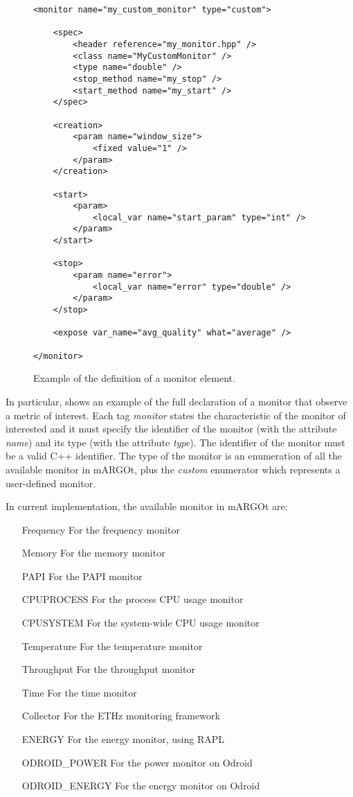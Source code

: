 \begin{figure}
\lstset{language=XML}
\begin{lstlisting}
<monitor name="my_custom_monitor" type="custom">

	<spec>
		<header reference="my_monitor.hpp" />
		<class name="MyCustomMonitor" />
		<type name="double" />
		<stop_method name="my_stop" />
		<start_method name="my_start" />
	</spec>
	
	<creation>
		<param name="window_size">
			<fixed value="1" />
		</param>
	</creation>
	
	<start>
		<param>
			<local_var name="start_param" type="int" />
		</param>
	</start>

	<stop>
		<param name="error">
			<local_var name="error" type="double" />
		</param>
	</stop>

	<expose var_name="avg_quality" what="average" />

</monitor>
\end{lstlisting}
\caption{Example of the definition of a monitor element.}
\label{code:monitor_xml}
\end{figure}


In particular,  shows an example of the full declaration of a monitor that observe a metric of interest.
Each tag \textit{monitor} states the characteristic of the monitor of interested and it must specify the identifier of the monitor (with the attribute \textit{name}) and its type (with the attribute \textit{type}).
The identifier of the monitor must be a valid C++ identifier.
The type of the monitor is an enumeration of all the available monitor in mARGOt, plus the \textit{custom} enumerator which represents a user-defined monitor.


In current implementation, the available monitor in mARGOt are:
\begin{enumerate}
	\item[Frequency] For the frequency monitor
	\item[Memory] For the memory monitor
	\item[PAPI] For the PAPI monitor
	\item[CPUPROCESS] For the process CPU usage monitor
	\item[CPUSYSTEM] For the system-wide CPU usage monitor
	\item[Temperature] For the temperature monitor
	\item[Throughput] For the throughput monitor
	\item[Time] For the time monitor
	\item[Collector] For the ETHz monitoring framework
	\item[ENERGY] For the energy monitor, using RAPL
	\item[ODROID\_POWER] For the power monitor on Odroid
	\item[ODROID\_ENERGY] For the energy monitor on Odroid
\end{enumerate}


